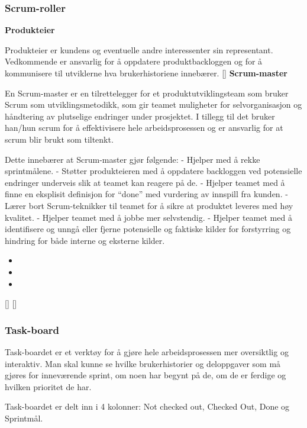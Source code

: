 \documentclass[12pt,a4paper,norsk]{article}
\begin{document}
	\subsubsection{Scrum-roller}\label{scrumroller}
	\textbf {Produkteier}
    \par Produkteier er kundens og eventuelle andre interessenter sin representant. Vedkommende er ansvarlig for å oppdatere  produktbackloggen og for å kommunisere til utviklerne hva brukerhistoriene innebærer.
    [\cite{scrumguides}]
    \textbf {Scrum-master}
    \par En Scrum-master er en tilrettelegger for et produktutviklingsteam som bruker Scrum som utviklingsmetodikk, som gir teamet muligheter for selvorganisasjon og håndtering av plutselige endringer under prosjektet. I tillegg til det bruker han/hun scrum for å effektivisere hele arbeidsprosessen og er ansvarlig for at scrum blir brukt som tiltenkt.
    
    Dette innebærer at Scrum-master gjør følgende:
- Hjelper med å rekke sprintmålene.
- Støtter produkteieren med å oppdatere backloggen ved potensielle endringer underveis slik at teamet kan reagere på de.
- Hjelper teamet med å finne en eksplisit definisjon for “done” med   vurdering av innspill fra kunden.
- Lærer bort Scrum-teknikker til teamet for å sikre at produktet      leveres med høy kvalitet.
- Hjelper teamet med å jobbe mer selvstendig.
- Hjelper teamet med å identifisere og unngå eller fjerne             potensielle og faktiske kilder for forstyrring og hindring for både interne og eksterne kilder.
    
    \begin{itemize}
    \item[] 
    \item[] 
    \item[] 
    \end{itemize}
    
    [\cite{scrummaster}]
    [\cite{scrummasterrole}]
   
    
	
	\subsubsection{Task-board}
	Task-boardet er et verktøy for å gjøre hele arbeidsprosessen mer oversiktlig og interaktiv. Man skal kunne se hvilke brukerhistorier og deloppgaver som må gjøres for inneværende sprint, om noen har begynt på de, om de er ferdige og hvilken prioritet de har.

    Task-boardet er delt inn i 4 kolonner: Not checked out, Checked Out, Done og Sprintmål.
    
\end{document}
